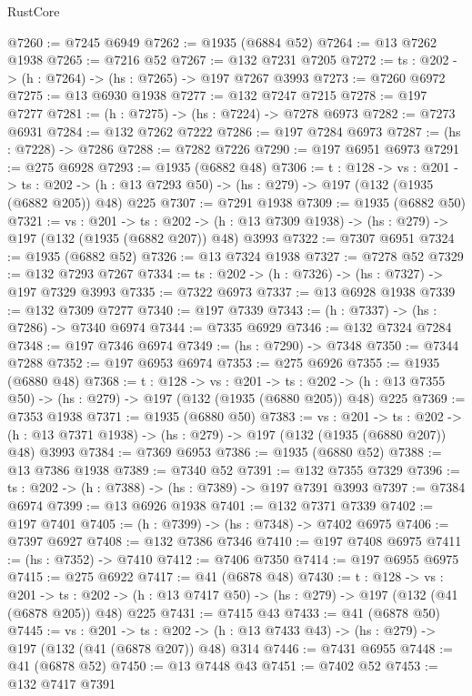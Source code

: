 \begin{lexlean}{RustCore}
\begin{coremodule}
@7260 := @7245 @6949
@7262 := @1935 (@6884 @52)
@7264 := @13 @7262 @1938
@7265 := @7216 @52
@7267 := @132 @7231 @7205
@7272 := {ts : @202} -> (h : @7264) -> (hs : @7265) -> @197 @7267 @3993
@7273 := @7260 @6972
@7275 := @13 @6930 @1938
@7277 := @132 @7247 @7215
@7278 := @197 @7277
@7281 := (h : @7275) -> (hs : @7224) -> @7278 @6973
@7282 := @7273 @6931
@7284 := @132 @7262 @7222
@7286 := @197 @7284 @6973
@7287 := (hs : @7228) -> @7286
@7288 := @7282 @7226
@7290 := @197 @6951 @6973
@7291 := @275 @6928
@7293 := @1935 (@6882 @48)
@7306 := {t : @128} ->
  {vs : @201} ->
  {ts : @202} -> (h : @13 @7293 @50) -> (hs : @279) -> @197 (@132 (@1935 (@6882 @205)) @48) @225
@7307 := @7291 @1938
@7309 := @1935 (@6882 @50)
@7321 := {vs : @201} ->
  {ts : @202} -> (h : @13 @7309 @1938) -> (hs : @279) -> @197 (@132 (@1935 (@6882 @207)) @48) @3993
@7322 := @7307 @6951
@7324 := @1935 (@6882 @52)
@7326 := @13 @7324 @1938
@7327 := @7278 @52
@7329 := @132 @7293 @7267
@7334 := {ts : @202} -> (h : @7326) -> (hs : @7327) -> @197 @7329 @3993
@7335 := @7322 @6973
@7337 := @13 @6928 @1938
@7339 := @132 @7309 @7277
@7340 := @197 @7339
@7343 := (h : @7337) -> (hs : @7286) -> @7340 @6974
@7344 := @7335 @6929
@7346 := @132 @7324 @7284
@7348 := @197 @7346 @6974
@7349 := (hs : @7290) -> @7348
@7350 := @7344 @7288
@7352 := @197 @6953 @6974
@7353 := @275 @6926
@7355 := @1935 (@6880 @48)
@7368 := {t : @128} ->
  {vs : @201} ->
  {ts : @202} -> (h : @13 @7355 @50) -> (hs : @279) -> @197 (@132 (@1935 (@6880 @205)) @48) @225
@7369 := @7353 @1938
@7371 := @1935 (@6880 @50)
@7383 := {vs : @201} ->
  {ts : @202} -> (h : @13 @7371 @1938) -> (hs : @279) -> @197 (@132 (@1935 (@6880 @207)) @48) @3993
@7384 := @7369 @6953
@7386 := @1935 (@6880 @52)
@7388 := @13 @7386 @1938
@7389 := @7340 @52
@7391 := @132 @7355 @7329
@7396 := {ts : @202} -> (h : @7388) -> (hs : @7389) -> @197 @7391 @3993
@7397 := @7384 @6974
@7399 := @13 @6926 @1938
@7401 := @132 @7371 @7339
@7402 := @197 @7401
@7405 := (h : @7399) -> (hs : @7348) -> @7402 @6975
@7406 := @7397 @6927
@7408 := @132 @7386 @7346
@7410 := @197 @7408 @6975
@7411 := (hs : @7352) -> @7410
@7412 := @7406 @7350
@7414 := @197 @6955 @6975
@7415 := @275 @6922
@7417 := @41 (@6878 @48)
@7430 := {t : @128} ->
  {vs : @201} ->
  {ts : @202} -> (h : @13 @7417 @50) -> (hs : @279) -> @197 (@132 (@41 (@6878 @205)) @48) @225
@7431 := @7415 @43
@7433 := @41 (@6878 @50)
@7445 := {vs : @201} ->
  {ts : @202} -> (h : @13 @7433 @43) -> (hs : @279) -> @197 (@132 (@41 (@6878 @207)) @48) @314
@7446 := @7431 @6955
@7448 := @41 (@6878 @52)
@7450 := @13 @7448 @43
@7451 := @7402 @52
@7453 := @132 @7417 @7391

\end{coremodule}
\end{lexlean}
